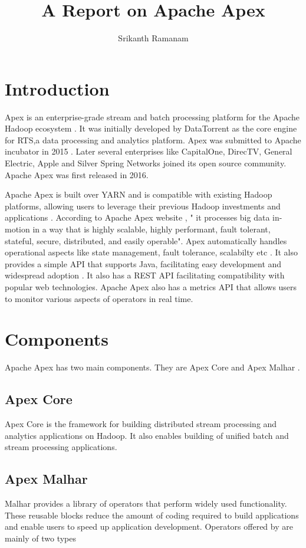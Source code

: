 \documentclass[9pt,twocolumn,twoside]{../../styles/osajnl}
\title{A Report on Apache Apex}
\author[1]{Srikanth Ramanam}
\affil[1]{School of Informatics and Computing, Bloomington, IN 47408, U.S.A.}
\affil[*]{Corresponding authors: srikrama@iu.edu}
\begin{document}
\maketitle

\section{Introduction}
 Apex is an enterprise-grade stream and batch processing platform for the  Apache Hadoop ecosystem \cite{www-asfblog}. It was initially developed by DataTorrent as the core engine for RTS,a data processing and analytics platform. Apex was submitted to Apache incubator in 2015 \cite{www-datatorrentapex}. Later several enterprises like CapitalOne, DirecTV, General Electric, Apple and Silver Spring Networks joined its open source community. Apache Apex was first released in 2016. 

Apache Apex is built over YARN and is compatible with existing Hadoop platforms, allowing users to leverage their previous Hadoop investments and applications \cite{www-apacheapexblog}. According to Apache Apex website \cite{www-apacheapexsite}, " it processes big data in-motion in a way that is highly scalable, highly performant, fault tolerant, stateful, secure, distributed, and easily operable".
Apex automatically handles operational aspects like state management, fault tolerance, scalabilty etc \cite{www-apacheapexdoc}. It also provides a simple API that supports Java, facilitating easy development and widespread adoption \cite{www-apacheapexdoc}. It also has a REST API facilitating compatibility with popular web technologies. Apache Apex also has a metrics API that allows users to monitor various aspects of operators in real time.







\section{Components}
Apache Apex has two main components. They are Apex Core and Apex Malhar \cite{www-apacheapexwiki}.
\subsection{Apex Core}
Apex Core is the framework for building distributed stream processing and analytics applications on Hadoop. It also enables building of unified batch and stream processing applications.
\subsection{Apex Malhar}
Malhar provides a library of operators that perform widely used functionality. These reusable blocks reduce the amount of coding required to build applications and enable users to speed up application development. Operators offered by are mainly of two types
\end{document}
